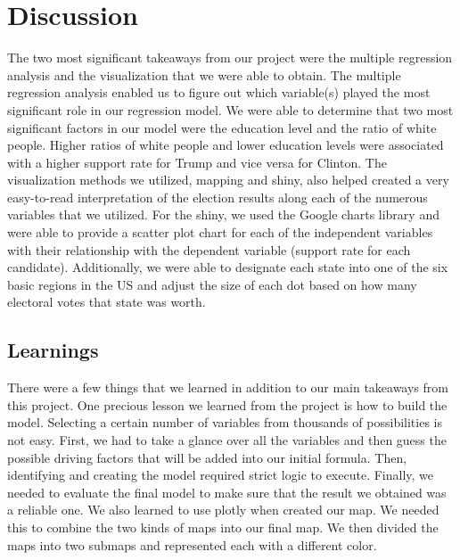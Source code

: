 \documentclass{article}
\begin{document}
{\section{Discussion}
%
%

The two most significant takeaways from our project were the multiple regression analysis and the visualization that we were able to obtain. The multiple regression analysis enabled us to figure out which variable(s) played the most significant role in our regression model. We were able to determine that two most significant factors in our model were the education level and the ratio of white people. Higher ratios of white people and lower education levels were associated with a higher support rate for Trump and vice versa for Clinton. The visualization methods we utilized, mapping and shiny, also helped created a very easy-to-read interpretation of the election results along each of the numerous variables that we utilized. For the shiny, we used the Google charts library and were able to provide a scatter plot chart for each of the independent variables with their relationship with the dependent variable (support rate for each candidate). Additionally, we were able to designate each state into one of the six basic regions in the US and adjust the size of each dot based on how many electoral votes that state was worth.



\subsection{Learnings}
%
%

There were a few things that we learned in addition to our main takeaways from this project. One precious lesson we learned from the project is how to build the model. Selecting a certain number of variables from thousands of possibilities is not easy. First, we had to take a glance over all the variables and then guess the possible driving factors that will be added into our initial formula. Then, identifying and creating the model required strict logic to execute. Finally, we needed to evaluate the final model to make sure that the result we obtained was a reliable one. We also learned to use plotly when created our map. We needed this to combine the two kinds of maps into our final map. We then divided the maps into two submaps and represented each with a different color.

}
\end{document}
